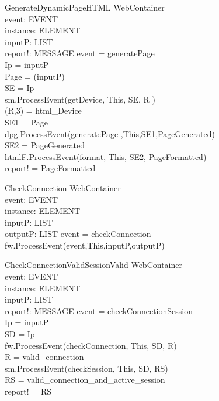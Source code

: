 \begin{schema}{GenerateDynamicPageHTML}
\Delta WebContainer \\
event: EVENT \\
instance: ELEMENT \\
inputP: LIST \\
report!: MESSAGE
\where event = generatePage \\
Ip = \head inputP \\
Page = \head (\tail inputP) \\
SE = \lseq Ip \rseq \\
sm.ProcessEvent(getDevice, This, SE, R ) \\
\nth(\head R,3) = html\_Device \\
SE1 = \lseq Page \rseq \\
dpg.ProcessEvent(generatePage ,This,SE1,PageGenerated) \\
SE2 = \lseq PageGenerated \rseq \\
htmlF.ProcessEvent(format, This, SE2, PageFormatted) \\
report! = PageFormatted
\end{schema}

\begin{schema}{CheckConnection}
\Delta WebContainer \\
event: EVENT \\
instance: ELEMENT \\
inputP: LIST \\
outputP: LIST 
\where event = checkConnection \\
fw.ProcessEvent(event,This,inputP,outputP)
\end{schema}

\begin{schema}{CheckConnectionValidSessionValid}
\Delta WebContainer \\
event: EVENT \\
instance: ELEMENT \\
inputP: LIST \\
report!: MESSAGE 
\where event = checkConnectionSession \\
Ip = \head inputP \\
SD = \lseq Ip \rseq \\
fw.ProcessEvent(checkConnection, This, SD, R) \\
R = valid\_connection \\
sm.ProcessEvent(checkSession, This, SD, RS) \\
RS = valid\_connection\_and\_active\_session \\
report! = RS
\end{schema}

